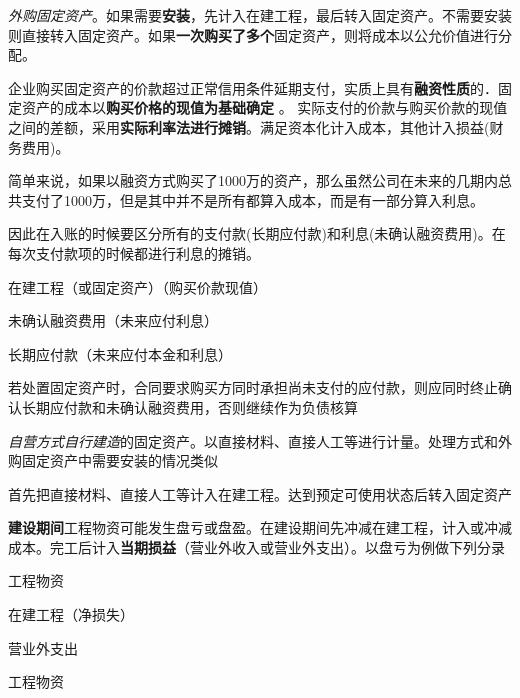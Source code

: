 \documentclass[UTF8,12pt]{ctexart}
\newenvironment{Dr}{%
	\begin{list}{}%
		{
			\setlength{\leftmargin}{2em}
			\setlength{\labelwidth}{2em}
			\setlength{\labelsep}{0pt}
			\setlength{\itemindent}{0pt}
			\setlength{\listparindent}{0pt}
			\setlength{\parsep}{0pt}
			\setlength{\topsep}{0pt}
		}
		\item[\textbf{借：}]
	}{%
	\end{list}
}
\newenvironment{Cr}{%
	\begin{list}{}%
		{
			\setlength{\leftmargin}{2em}
			\setlength{\labelwidth}{2em}
			\setlength{\labelsep}{0pt}
			\setlength{\itemindent}{0pt}
			\setlength{\listparindent}{0pt}
			\setlength{\parsep}{0pt}
			\setlength{\topsep}{0pt}
		}
		\item[\textbf{贷：}]
	}{%
	\end{list}
}
\numberwithin{equation}{section} %
\numberwithin{figure}{section}
\numberwithin{table}{section}
\begin{document}
	\begin{enumerate}
		\item \textit{外购固定资产}。如果需要\textbf{安装}，先计入在建工程，最后转入固定资产。不需要安装则直接转入固定资产。如果\textbf{一次购买了多个}固定资产，则将成本以公允价值进行分配。
		
		企业购买固定资产的价款超过正常信用条件延期支付，实质上具有\textbf{融资性质}的．固定资产的成本以\textbf{购买价格的现值为基础确定} 。 实际支付的价款与购买价款的现值之间的差额，采用\textbf{实际利率法进行摊销}。满足资本化计入成本，其他计入损益(财务费用)。
		
		简单来说，如果以融资方式购买了1000万的资产，那么虽然公司在未来的几期内总共支付了1000万，但是其中并不是所有都算入成本，而是有一部分算入利息。
		
		因此在入账的时候要区分所有的支付款(长期应付款)和利息(未确认融资费用)。在每次支付款项的时候都进行利息的摊销。
		
		\begin{Dr}
			在建工程（或固定资产）（购买价款现值）
			
			未确认融资费用（未来应付利息）
		\end{Dr}
		\begin{Cr}
			长期应付款（未来应付本金和利息）
		\end{Cr}
		
		若处置固定资产时，合同要求购买方同时承担尚未支付的应付款，则应同时终止确认长期应付款和未确认融资费用，否则继续作为负债核算
		
		\item \textit{自营方式自行建造}的固定资产。以直接材料、直接人工等进行计量。处理方式和外购固定资产中需要安装的情况类似
		
		首先把直接材料、直接人工等计入在建工程。达到预定可使用状态后转入固定资产
		
		\textbf{建设期间}工程物资可能发生盘亏或盘盈。在建设期间先冲减在建工程，计入或冲减成本。完工后计入\textbf{当期损益}（营业外收入或营业外支出）。以盘亏为例做下列分录
		
		\begin{Dr}
			工程物资
		\end{Dr}
		\begin{Cr}
			在建工程（净损失）
		\end{Cr}
		
		\begin{Dr}
			营业外支出
		\end{Dr}
		\begin{Cr}
			工程物资
		\end{Cr}
		

\end{enumerate}
\end{document}
